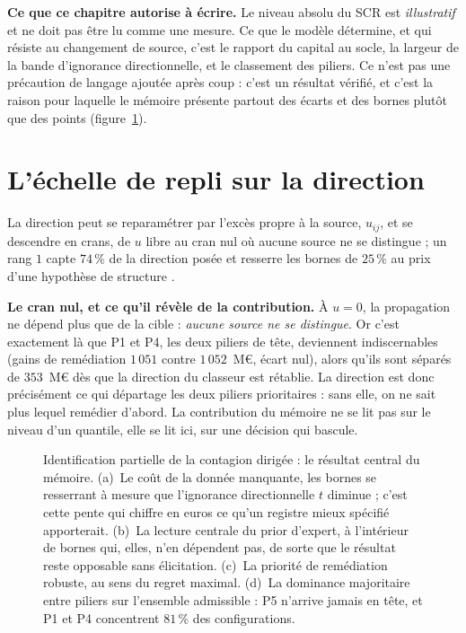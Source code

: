 \begin{cle}
\textbf{Ce que ce chapitre autorise à écrire.} Le niveau absolu du SCR est
\emph{illustratif} et ne doit pas être lu comme une mesure. Ce que le modèle détermine,
et qui résiste au changement de source, c'est le rapport du capital au socle, la largeur
de la bande d'ignorance directionnelle, et le classement des piliers. Ce n'est pas une
précaution de langage ajoutée après coup : c'est un résultat vérifié, et c'est la raison
pour laquelle le mémoire présente partout des écarts et des bornes plutôt que des points
(figure~\ref{fig:partielle}).
\end{cle}

\section{L'échelle de repli sur la direction}
\label{sec:echelle-u}

La direction peut se reparamétrer par l'excès propre à la source, $u_{ij}$, et se descendre en
crans, de $u$ libre au cran nul où aucune source ne se distingue ; un rang $1$ capte $74\,\%$ de la
direction posée et resserre les bornes de $25\,\%$ au prix d'une hypothèse de structure
\matcomp.

\begin{cle}
\textbf{Le cran nul, et ce qu'il révèle de la contribution.} À $u=0$, la propagation ne
dépend plus que de la cible : \emph{aucune source ne se distingue}. Or c'est exactement là
que P1 et P4, les deux piliers de tête, deviennent indiscernables (gains de
remédiation $1\,051$ contre $1\,052$~M\euro{}, écart nul), alors qu'ils sont séparés de
$353$~M\euro{} dès que la direction du classeur est rétablie. La direction est donc
précisément ce qui départage les deux piliers prioritaires : sans elle, on ne sait plus
lequel remédier d'abord. La contribution du mémoire ne se lit pas sur le niveau d'un
quantile, elle se lit ici, sur une décision qui bascule.
\end{cle}

\begin{figure}[H]
  \centering
  \caption{Identification partielle de la contagion dirigée : le
résultat central du mémoire. (a)~Le coût de la donnée manquante, les bornes se
resserrant à mesure que l'ignorance directionnelle $t$ diminue ; c'est cette pente qui chiffre
en euros ce qu'un registre mieux spécifié apporterait. (b)~La lecture centrale du prior
d'expert, à l'intérieur de bornes qui, elles, n'en dépendent pas, de sorte que le résultat reste
opposable sans élicitation. (c)~La priorité de remédiation robuste, au sens du regret
maximal. (d)~La dominance majoritaire entre piliers sur l'ensemble admissible : P5
n'arrive jamais en tête, et P1 et P4 concentrent $81\,\%$ des configurations.}
  \label{fig:partielle}
\end{figure}

